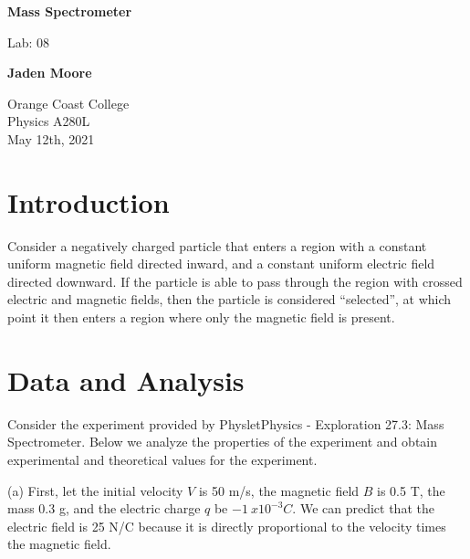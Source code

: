 \documentclass[12pt]{article}
\begin{document}

\begin{titlepage}
    \begin{center}
        \vspace*{1cm}
        \textbf{Mass Spectrometer}

        \vspace{0.5cm}
        Lab: 08

        \vspace{1cm}

        \textbf{Jaden Moore}

        \vfill

        Orange Coast College\\
        Physics A280L\\
        May 12th, 2021

    \end{center}
\end{titlepage}

\pagestyle{fancy}
\fancyhf{}
\setlength{\headheight}{15pt}
\cfoot{\thepage}

\section{Introduction}
Consider a negatively charged particle that enters a region with a constant uniform magnetic field directed inward, and a constant uniform electric field directed downward. If the particle is able to pass through the region with crossed electric and magnetic fields, then the particle is considered ``selected'', at which point it then enters a region where only the magnetic field is present.

\section{Data and Analysis}
Consider the experiment provided by Physlet\textregistered \space Physics - Exploration 27.3: Mass Spectrometer. Below we analyze the properties of the experiment and obtain experimental and theoretical values for the experiment.

\bigskip

(a) First, let the initial velocity $V$ is 50 m/s, the magnetic field $B$ is 0.5 T, the mass 0.3 g, and the electric charge $q$ be $\SI{-1}{x 10^{-3} C}$. We can predict that the electric field is 25 N/C because it is directly proportional to the velocity times the magnetic field.
\end{document}
